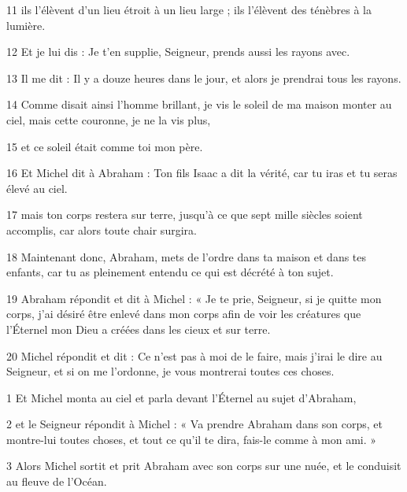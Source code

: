 \par 11 ils l'élèvent d'un lieu étroit à un lieu large ; ils l'élèvent des ténèbres à la lumière.

\par 12 Et je lui dis : Je t'en supplie, Seigneur, prends aussi les rayons avec.

\par 13 Il me dit : Il y a douze heures dans le jour, et alors je prendrai tous les rayons.

\par 14 Comme disait ainsi l'homme brillant, je vis le soleil de ma maison monter au ciel, mais cette couronne, je ne la vis plus,

\par 15 et ce soleil était comme toi mon père.

\par 16 Et Michel dit à Abraham : Ton fils Isaac a dit la vérité, car tu iras et tu seras élevé au ciel.

\par 17 mais ton corps restera sur terre, jusqu'à ce que sept mille siècles soient accomplis, car alors toute chair surgira.

\par 18 Maintenant donc, Abraham, mets de l'ordre dans ta maison et dans tes enfants, car tu as pleinement entendu ce qui est décrété à ton sujet.

\par 19 Abraham répondit et dit à Michel : « Je te prie, Seigneur, si je quitte mon corps, j'ai désiré être enlevé dans mon corps afin de voir les créatures que l'Éternel mon Dieu a créées dans les cieux et sur terre.

\par 20 Michel répondit et dit : Ce n'est pas à moi de le faire, mais j'irai le dire au Seigneur, et si on me l'ordonne, je vous montrerai toutes ces choses.


\par 1 Et Michel monta au ciel et parla devant l'Éternel au sujet d'Abraham,

\par 2 et le Seigneur répondit à Michel : « Va prendre Abraham dans son corps, et montre-lui toutes choses, et tout ce qu'il te dira, fais-le comme à mon ami. »

\par 3 Alors Michel sortit et prit Abraham avec son corps sur une nuée, et le conduisit au fleuve de l'Océan.

